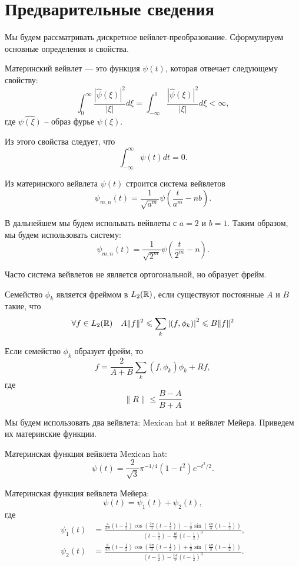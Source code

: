 \documentclass[../paper.tex]{subfiles}
\begin{document}
\section{Предварительные сведения}
Мы будем рассматривать дискретное вейвлет-преобразование. Сформулируем основные определения и свойства.
\begin{Def}
Материнский вейвлет --- это функция $\psi(t)$, которая отвечает следующему свойству:
\[
	\int_0^\infty \frac{ \left|\hat{\psi}(\xi)\right|^2 }{\left|\xi\right|} d \xi
	= \int_{-\infty}^0 \frac{ \left|\hat{\psi}(\xi)\right|^2 }{\left|\xi\right|} d \xi
	< \infty
,\] где $\hat{\psi(\xi)}$ -- образ фурье $\psi(\xi)$.
\end{Def}

Из этого свойства следует, что
\[
	\int_{-\infty}^{\infty} \psi(t) dt = 0
.\]

Из материнского вейвлета $\psi(t)$ строится система вейвлетов
\[
	\psi_{m,n}(t) = \frac{1}{\sqrt{a^m}} \psi\left(\frac{t}{a^m} - n b\right)
.\]

В дальнейшем мы будем испольвать вейвлеты с $a=2$ и $b=1$.
Таким образом, мы будем использовать систему:
\[
	\psi_{m,n}(t) = \frac{1}{\sqrt{2^m}} \psi\left(\frac{t}{2^m} - n\right)
.\]

Часто система вейвлетов не является ортогональной, но образует фрейм.
\begin{Def}
Семейство $\phi_k$ является фреймом в $L_2(\mathbb{R})$, если существуют постоянные $A$ и $B$ такие, что
\[
\forall f \in L_2(\mathbb{R}) \quad A \|f\|^2 \leqslant \sum_k \left|\left(f, \phi_k\right)\right|^2 \leqslant B \|f\|^2
\]

\begin{Lem*}
Если семейство $\phi_k$ образует фрейм, то
\[
	f = \frac{2}{A+B} \sum_k \left(f, \phi_k\right)\phi_k + Rf
,\] где \[
	\|R\| \leqslant \frac{B-A}{B+A}
\]

Мы будем использовать два вейвлета: Mexican hat и вейвлет Мейера. Приведем их материнские функции.

\begin{Def}
Материнская функция вейвлета Mexican hat:
\[
	\psi(t) = \frac{2}{\sqrt{3}} \pi^{-1/4} \left(1-t^2\right) e^{-t^2/2}
.\]
\end{Def}
\begin{Def}
Материнская функция вейвлета Мейера:
\[
	\psi(t) = \psi_1(t) + \psi_2(t)
,\] где
\begin{align*}
	\psi_1(t) &=
		\frac{
			\frac{4}{3\pi}\left(t-\frac{1}{2}\right) \cos\left(\frac{2\pi}{3}\left(t-\frac{1}{2}\right)\right) 
			- \frac{1}{\pi} \sin \left(\frac{4\pi}{3}\left(t-\frac{1}{2}\right)\right)
		}{
			\left(t-\frac{1}{2}\right) - \frac{16}{9} \left(t - \frac{1}{2}\right)^3
		}, \\
	\psi_2(t) &=
		\frac{
			\frac{8}{3\pi}\left(t-\frac{1}{2}\right) \cos\left(\frac{8\pi}{3}\left(t-\frac{1}{2}\right)\right) 
			+ \frac{1}{\pi} \sin \left(\frac{4\pi}{3}\left(t-\frac{1}{2}\right)\right)
		}{
			\left(t-\frac{1}{2}\right) - \frac{64}{9} \left(t - \frac{1}{2}\right)^3
		}.
\end{align*}
\end{Def}
\end{Lem*}
\end{Def}
\end{document}
